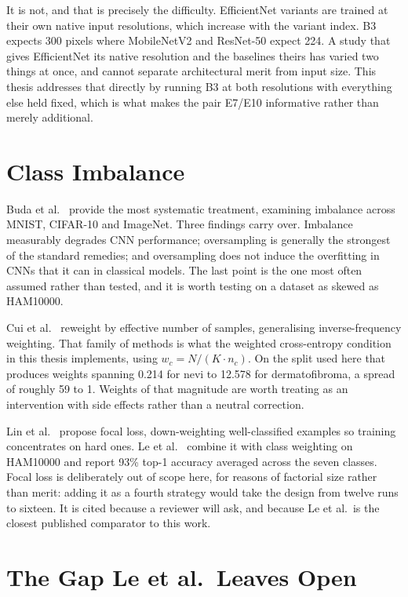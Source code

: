 It is not, and that is precisely the difficulty. EfficientNet variants are trained at
their own native input resolutions, which increase with the variant index. B3 expects
300 pixels where MobileNetV2 and ResNet-50 expect 224. A study that gives EfficientNet
its native resolution and the baselines theirs has varied two things at once, and cannot
separate architectural merit from input size. This thesis addresses that directly by
running B3 at both resolutions with everything else held fixed, which is what makes the
pair E7/E10 informative rather than merely additional.

\section{Class Imbalance}
\label{sec:lit-imbalance}

Buda et al.~\cite{buda2018classimbalance} provide the most systematic treatment,
examining imbalance across MNIST, CIFAR-10 and ImageNet. Three findings carry over.
Imbalance measurably degrades CNN performance; oversampling is generally the strongest
of the standard remedies; and oversampling does not induce the overfitting in CNNs that
it can in classical models. The last point is the one most often assumed rather than
tested, and it is worth testing on a dataset as skewed as HAM10000.

Cui et al.~\cite{cui2019classbalanced} reweight by effective number of samples,
generalising inverse-frequency weighting. That family of methods is what the weighted
cross-entropy condition in this thesis implements, using $w_c = N / (K \cdot n_c)$. On
the split used here that produces weights spanning 0.214 for nevi to 12.578 for
dermatofibroma, a spread of roughly 59 to 1. Weights of that magnitude are worth
treating as an intervention with side effects rather than a neutral correction.

Lin et al.~\cite{lin2017focal} propose focal loss, down-weighting well-classified
examples so training concentrates on hard ones. Le et al.~\cite{le2020classweightedfocal}
combine it with class weighting on HAM10000 and report 93\% top-1 accuracy averaged
across the seven classes. Focal loss is deliberately out of scope here, for reasons of
factorial size rather than merit: adding it as a fourth strategy would take the design
from twelve runs to sixteen. It is cited because a reviewer will ask, and because Le et
al.\ is the closest published comparator to this work.

\section{The Gap Le et al.\ Leaves Open}
\label{sec:lit-gap}


